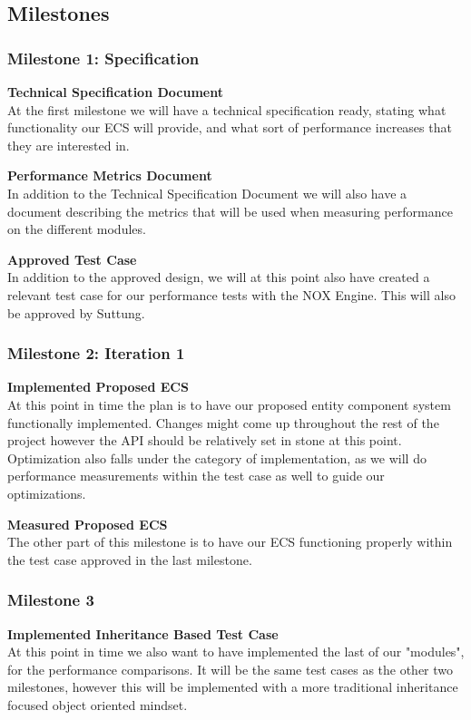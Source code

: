 \subsection{Milestones}
\subsubsection{Milestone 1: Specification}
\noindent\textbf{Technical Specification Document}\\
At the first milestone we will have a technical specification ready,
stating what functionality our ECS will provide, and what sort of performance
increases that they are interested in.

\noindenx\textbf{Performance Metrics Document}\\
In addition to the Technical Specification Document we will also have a document
describing the metrics that will be used when measuring performance on the different modules.

\noindent\textbf{Approved Test Case}\\
In addition to the approved design, we will at this point also have created a
relevant test case for our performance tests with the NOX Engine. 
This will also be approved by Suttung.

\subsubsection{Milestone 2: Iteration 1}
\noindent\textbf{Implemented Proposed ECS}\\
At this point in time the plan is to have our proposed entity component system
functionally implemented. Changes might come up throughout the rest of the project
however the API should be relatively set in stone at this point.
Optimization also falls under the category of implementation, as we will do 
performance measurements within the test case as well to guide our optimizations.

\noindent\textbf{Measured Proposed ECS}\\
The other part of this milestone is to have our ECS functioning properly within
the test case approved in the last milestone. 

\subsubsection{Milestone 3}
\noindent\textbf{Implemented Inheritance Based Test Case}\\
At this point in time we also want to have implemented the last of our "modules",
for the performance comparisons. It will be the same test cases as the other two
milestones, however this will be implemented with a more traditional inheritance focused
object oriented mindset.

